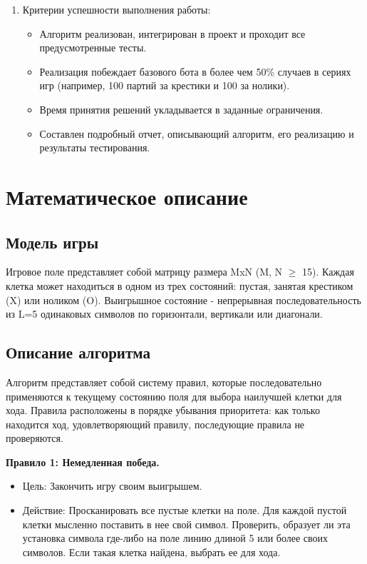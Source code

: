 \documentclass[a4paper]{article}
\begin{document}
\begin{enumerate}
\begin{itemize}
	\end{itemize}
	\item Критерии успешности выполнения работы:
	\begin{itemize}
		\item Алгоритм реализован, интегрирован в проект и проходит все предусмотренные тесты.
		\item Реализация побеждает базового бота в более чем 50\% случаев в сериях игр (например, 100 партий за крестики и 100 за нолики).
		\item Время принятия решений укладывается в заданные ограничения.
		\item Составлен подробный отчет, описывающий алгоритм, его реализацию и результаты тестирования.
		 
	\end{itemize}
\end{enumerate}
\clearpage

\section{Математическое описание}
\subsection{Модель игры}
Игровое поле представляет собой матрицу размера MxN (M, N $\geq$ 15). Каждая клетка может находиться в одном из трех состояний: пустая, занятая крестиком (X) или ноликом (O).
Выигрышное состояние - непрерывная последовательность из L=5 одинаковых символов по горизонтали, вертикали или диагонали.

\subsection{Описание алгоритма}
Алгоритм представляет собой систему правил, которые последовательно применяются к текущему состоянию поля для выбора наилучшей клетки для хода. Правила расположены в порядке убывания приоритета: как только находится ход, удовлетворяющий правилу, последующие правила не проверяются.

\textbf{Правило 1: Немедленная победа.}

\begin{itemize}
	\item Цель: Закончить игру своим выигрышем.
	\item Действие: Просканировать все пустые клетки на поле. Для каждой пустой клетки мысленно поставить в нее свой символ. Проверить, образует ли эта установка символа где-либо на поле линию длиной 5 или более своих символов. Если такая клетка найдена, выбрать ее для хода.
\end{itemize}
\end{document}
